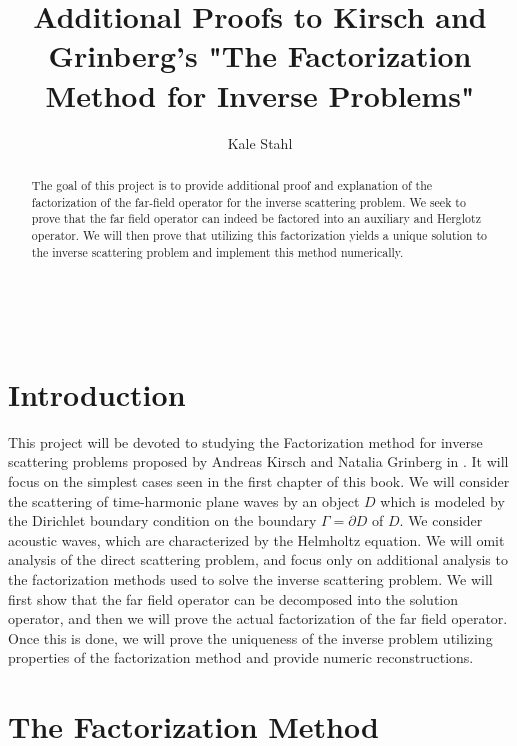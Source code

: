 \documentclass[]{article}
\title{Additional Proofs to Kirsch and Grinberg's  "The Factorization Method for Inverse Problems"}
\date{}
\author{Kale Stahl}
\newcommand{\bd}{\textbf}
\begin{document}
		
		\makeatletter
		\begin{center}
			{\centering \Large \bd \@title}\\
			\vspace{.5cm}
			{\large \@author}
			\vspace{.25cm}
		\end{center}
		\makeatother
		\begin{abstract}
			The goal of this project is to provide additional proof and explanation of the factorization of the far-field operator for the inverse scattering problem. We seek to prove that the far field operator can indeed be factored into an auxiliary and Herglotz operator. We will then prove that utilizing this factorization yields a unique solution to the inverse scattering problem and implement this method numerically.
		\end{abstract}
		\tableofcontents
		
		\section{Introduction}		
			This project will be devoted to studying the Factorization method for inverse scattering problems proposed by Andreas Kirsch and Natalia Grinberg in \cite{kirschgrinberg2008}. It will focus on the simplest cases seen in the first chapter of this book. We will consider the scattering of time-harmonic plane waves by an object $D$ which is modeled by the Dirichlet boundary condition on the boundary $\Gamma = \partial D$ of $D$. We consider acoustic waves, which are characterized by the Helmholtz equation. We will omit analysis of the direct scattering problem, and focus only on additional analysis to the factorization methods used to solve the inverse scattering problem. We will first show that the far field operator can be decomposed into the solution operator, and then we will prove the actual factorization of the far field operator. Once this is done, we will prove the uniqueness of the inverse problem utilizing properties of the factorization method and provide numeric reconstructions.
		\section{The Factorization Method}
			
\end{document}
